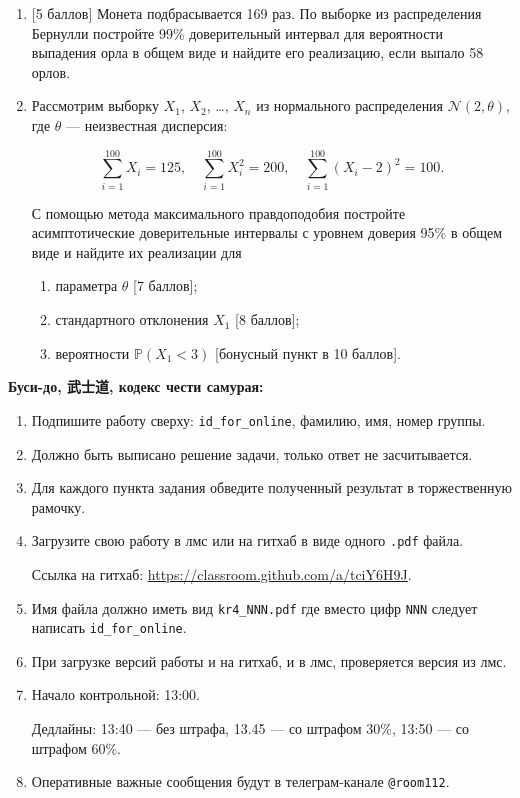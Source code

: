 \documentclass[12pt]{article}
\def \cN{\mathcal{N}}
\def \P{\mathbb{P}}
\begin{document}
\begin{enumerate}

\item {[5 баллов]} Монета подбрасывается 169 раз. По выборке из распределения Бернулли
постройте 99\% доверительный интервал для вероятности выпадения орла в общем виде и найдите его
реализацию, если выпало 58 орлов.

\item Рассмотрим выборку $X_1$, $X_2$, \ldots, $X_n$ из нормального распределения $\cN(2, \theta)$, 
где $\theta$ — неизвестная дисперсия:

\[
\sum_{i=1}^{100} X_i = 125, 
\quad \sum_{i=1}^{100} X_i^2 = 200, 
\quad \sum_{i=1}^{100} (X_i - 2)^2 = 100.  
\]

С помощью метода максимального правдоподобия 
постройте асимптотические доверительные интервалы с уровнем доверия 95\% в общем виде и найдите их реализации для  

\begin{enumerate}
  \item параметра $\theta$ {[7 баллов]};
  \item стандартного отклонения $X_1$ {[8 баллов]};
  \item вероятности $\P(X_1 < 3)$ {[бонусный пункт в 10 баллов]}.
\end{enumerate}

\end{enumerate}

\textbf{Буси-до, 武士道, кодекс чести самурая:}

\vspace{5mm}

\begin{enumerate}
\item Подпишите работу сверху: \verb|id_for_online|, фамилию, имя, номер группы.
\item Должно быть выписано решение задачи, только ответ не засчитывается.
\item Для каждого пункта задания обведите полученный результат в торжественную рамочку.
\item Загрузите свою работу в лмс или на гитхаб в виде одного \verb|.pdf| файла.

Ссылка на гитхаб: \url{https://classroom.github.com/a/tciY6H9J}.
\item Имя файла должно иметь вид \verb|kr4_NNN.pdf| где вместо цифр \verb|NNN| следует написать \verb|id_for_online|.
\item При загрузке версий работы и на гитхаб, и в лмс, проверяется версия из лмс. 
\item Начало контрольной: 13:00. 

Дедлайны: 13:40 — без штрафа, 13.45 — со штрафом 30\%, 13:50 — со штрафом 60\%.
\item Оперативные важные сообщения будут в телеграм-канале \verb|@room112|.
\end{enumerate}
\end{document}
